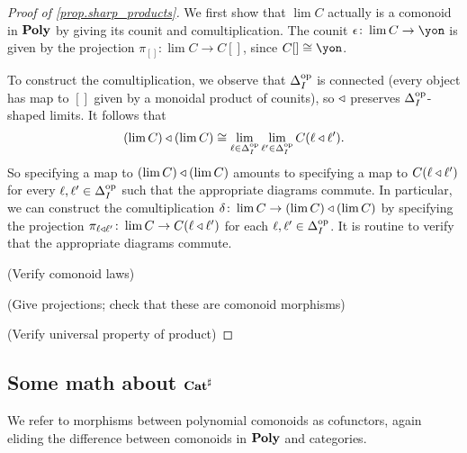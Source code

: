 \documentclass[Book-Poly]{subfiles}
\begin{document}
\begin{proof}[Proof of \cref{prop.sharp_products}]
We first show that $\lim C$ actually is a comonoid in $\mathbf{Poly}$ by giving its counit and comultiplication.
The counit $\epsilon \colon \lim C \to \yon$ is given by the projection $\pi_{[]} \colon \lim C \to C[]$, since $C[] \iso \yon$.

To construct the comultiplication, we observe that $\Delta_I^{\textnormal{op}}$ is connected (every object has map to $[]$ given by a monoidal product of counits), so $\mathbin{\triangleleft}$ preserves $\Delta_I^{\textnormal{op}}$-shaped limits.
It follows that
\[
    (\lim C) \mathbin{\triangleleft} (\lim C) \cong \lim_{\ell \in \Delta_I^{\textnormal{op}}} \lim_{\ell' \in \Delta_I^{\textnormal{op}}} C(\ell \mathbin{\triangleleft} \ell').
\]
So specifying a map to $(\lim C) \mathbin{\triangleleft} (\lim C)$ amounts to specifying a map to $C(\ell \mathbin{\triangleleft} \ell')$ for every $\ell, \ell' \in \Delta_I^{\textnormal{op}}$ such that the appropriate diagrams commute.
In particular, we can construct the comultiplication $\delta \colon \lim C \to (\lim C) \mathbin{\triangleleft} (\lim C)$ by specifying the projection $\pi_{\ell \mathbin{\triangleleft} \ell'} \colon \lim C \to C(\ell \mathbin{\triangleleft} \ell')$ for each $\ell, \ell' \in \Delta_I^{\textnormal{op}}$.
It is routine to verify that the appropriate diagrams commute.

(Verify comonoid laws)

(Give projections; check that these are comonoid morphisms)

(Verify universal property of product)
\end{proof}

\subsection{Some math about $\mathbf{Cat}^\sharp$}
We refer to morphisms between polynomial comonoids as cofunctors, again eliding the difference between comonoids in $\mathbf{Poly}$ and categories.
\end{document}
